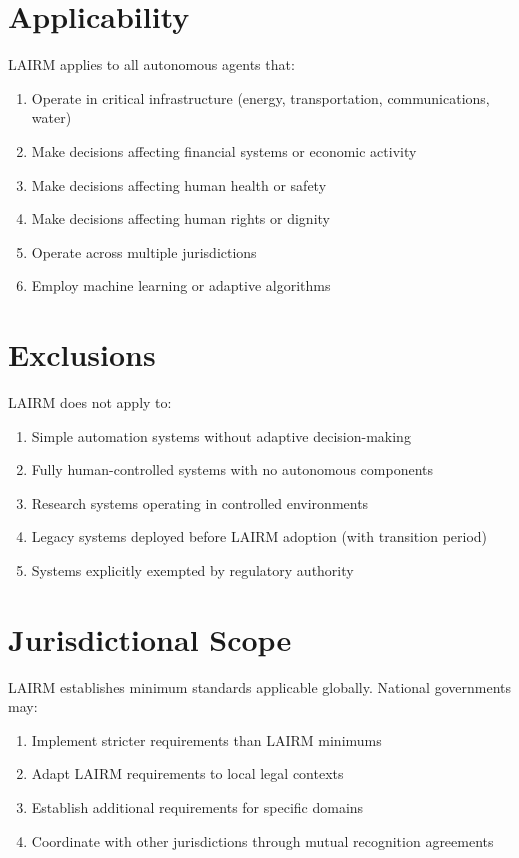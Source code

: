 \documentclass[12pt,a4paper,twoside,openright]{book}
\begin{document}
\section{Applicability}

LAIRM applies to all autonomous agents that:
\begin{enumerate}
    \item Operate in critical infrastructure (energy, transportation, communications, water)
    \item Make decisions affecting financial systems or economic activity
    \item Make decisions affecting human health or safety
    \item Make decisions affecting human rights or dignity
    \item Operate across multiple jurisdictions
    \item Employ machine learning or adaptive algorithms
\end{enumerate}

\section{Exclusions}

LAIRM does not apply to:
\begin{enumerate}
    \item Simple automation systems without adaptive decision-making
    \item Fully human-controlled systems with no autonomous components
    \item Research systems operating in controlled environments
    \item Legacy systems deployed before LAIRM adoption (with transition period)
    \item Systems explicitly exempted by regulatory authority
\end{enumerate}

\section{Jurisdictional Scope}

LAIRM establishes minimum standards applicable globally. National governments may:
\begin{enumerate}
    \item Implement stricter requirements than LAIRM minimums
    \item Adapt LAIRM requirements to local legal contexts
    \item Establish additional requirements for specific domains
    \item Coordinate with other jurisdictions through mutual recognition agreements
\end{enumerate}
\end{document}
